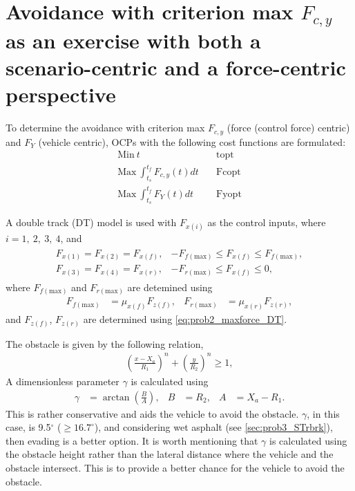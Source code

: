 \chapter[Force and scenario centric]{Avoidance with criterion max $F_{c,y}$ as an exercise with both a scenario-centric and a force-centric perspective}

To determine the avoidance with criterion max $F_{c,y}$ (force (control force) centric) and $F_{Y}$ (vehicle centric),  OCPs with the following cost functions are formulated:
\begin{align}
    \text{Min}\ t & \quad\text{topt}\\
    \text{Max}\ \int_{t_s}^{t_f} F_{c,y}(t) dt & \quad\text{Fcopt}\\
    \text{Max}\ \int_{t_s}^{t_f} F_{Y}(t) dt & \quad\text{Fyopt}
\end{align}

A double track (DT) model is used with $F_{x(i)}$ as the control inputs, where $i = 1,\ 2,\ 3,\ 4$, and 
\begin{align}
    \begin{array}{cl}
        F_{x(1)} = F_{x(2)} = F_{x(f)}, & -F_{f(\text{max})} \leq F_{x(f)} \leq F_{f(\text{max})}, \\
        F_{x(3)} = F_{x(4)} = F_{x(r)}, & -F_{r(\text{max})} \leq F_{x(f)} \leq 0,
    \end{array}
\end{align}
where $F_{f(\text{max})}$ and $F_{r(\text{max})}$ are detemined using 
\begin{align}
    F_{f(\text{max})} &= \mu_{x(f)}F_{z(f)}, & F_{r(\text{max})} &= \mu_{x(r)}F_{z(r)},
\end{align}
and $F_{z(f)}$, $F_{z(r)}$ are determined using \eqref{eq:prob2_maxforce_DT}.

The obstacle is given by the following relation, 
\begin{align}
    \left(\frac{x - X_a}{R_1}\right)^n + \left(\frac{y}{R_2}\right)^n \geq 1,
\end{align}
A dimensionless parameter $\gamma$ is calculated using 
\begin{align}
    \gamma &= \arctan\left(\frac{B}{A}\right), & B &= R_2, & A&= X_a - R_1.
\end{align}
This is rather conservative and aids the vehicle to avoid the obstacle. 
$\gamma$, in this case, is 9.5$^\circ$ ($\geq 16.7^\circ$), and considering wet asphalt (see \ref{sec:prob3_STrbrk}), then evading is a better option. 
It is worth mentioning that $\gamma$ is calculated using the obstacle height rather than the lateral distance where the vehicle and the obstacle intersect. 
This is to provide a better chance for the vehicle to avoid the obstacle. 

